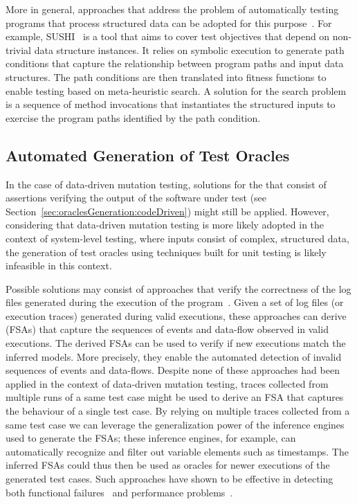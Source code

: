 More in general, approaches that address the problem of automatically testing programs that process structured data can be adopted for this purpose~\cite{Kiran:2008,Braione:2017,Braione:2018}. For example, SUSHI~\cite{Braione:2018} is a tool that aims to cover test objectives that depend on non-trivial data structure instances. 
It relies on symbolic execution to generate path conditions that capture the relationship between program paths and input data structures. The path conditions are then translated into fitness functions to enable testing based on meta-heuristic search. A solution for the search problem is a sequence of method invocations that instantiates the structured inputs to exercise the program paths identified by the path condition. 

\subsection{Automated Generation of Test Oracles}
\label{sec:oracles:dataMutation}

In the case of data-driven mutation testing, solutions for the  that consist of assertions verifying the output of the software under test (see Section~\ref{sec:oraclesGeneration:codeDriven}) might still be applied. However, considering that data-driven mutation testing is more likely adopted in the context of system-level testing, where inputs consist of complex, structured data, the generation of test oracles using techniques built for unit testing is likely infeasible in this context. 

Possible solutions may consist of approaches that verify the correctness of the log files generated during the execution of the program~\cite{Pastore:ISSRE:08,Pastore:TKT:17}.
Given a set of log files (or execution traces) generated during valid executions, these approaches can derive  (FSAs) that capture the sequences of events and data-flow observed in valid executions. The derived FSAs can be used to verify if new executions match the inferred models. More precisely, they enable the automated detection of invalid sequences of events and data-flows. Despite none of these approaches had been applied in the context of data-driven mutation testing, traces collected from multiple runs of a same test case might be used to derive an FSA that captures the behaviour of a single test case. By relying on multiple traces collected from a same test case we can leverage the generalization power of the inference engines used to generate the FSAs; these inference engines, for example, can automatically recognize and filter out variable elements such as timestamps. The inferred FSAs could thus then be used as oracles for newer executions of the generated test cases. Such approaches have shown to be effective in detecting both functional failures~\cite{Pastore:ISSRE:08} and performance problems~\cite{Pastore:TKT:17}.



